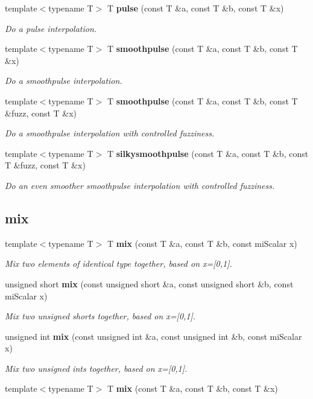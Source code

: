\begin{CompactItemize}
template$<$typename T$>$ T {\bf pulse} (const T \&a, const T \&b, const T \&x)
\begin{CompactList}\small\item\em Do a pulse interpolation. \item\end{CompactList}\item 
template$<$typename T$>$ T {\bf smoothpulse} (const T \&a, const T \&b, const T \&x)
\begin{CompactList}\small\item\em Do a smoothpulse interpolation. \item\end{CompactList}\item 
template$<$typename T$>$ T {\bf smoothpulse} (const T \&a, const T \&b, const T \&fuzz, const T \&x)
\begin{CompactList}\small\item\em Do a smoothpulse interpolation with controlled fuzziness. \item\end{CompactList}\item 
template$<$typename T$>$ T {\bf silkysmoothpulse} (const T \&a, const T \&b, const T \&fuzz, const T \&x)
\begin{CompactList}\small\item\em Do an even smoother smoothpulse interpolation with controlled fuzziness. \item\end{CompactList}\end{CompactItemize}
\subsection*{mix}
\begin{CompactItemize}
\item 
template$<$typename T$>$ T {\bf mix} (const T \&a, const T \&b, const mi\-Scalar x)
\begin{CompactList}\small\item\em Mix two elements of identical type together, based on x=[0,1]. \item\end{CompactList}\item 
unsigned short {\bf mix} (const unsigned short \&a, const unsigned short \&b, const mi\-Scalar x)
\begin{CompactList}\small\item\em Mix two unsigned shorts together, based on x=[0,1]. \item\end{CompactList}\item 
unsigned int {\bf mix} (const unsigned int \&a, const unsigned int \&b, const mi\-Scalar x)
\begin{CompactList}\small\item\em Mix two unsigned ints together, based on x=[0,1]. \item\end{CompactList}\item 
template$<$typename T$>$ T {\bf mix} (const T \&a, const T \&b, const T \&x)
\end{CompactItemize}
